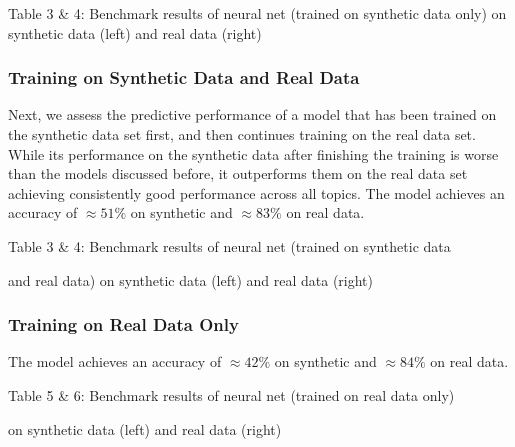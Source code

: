 \documentclass[11pt]{article}
\begin{document}
\begin{center}
	
\qquad

\end{center}
\begin{center}
Table 3 \& 4: Benchmark results of neural net (trained on synthetic data only) on synthetic data (left) and real data (right)
\end{center}




\subsubsection{Training on Synthetic Data and Real Data}
Next, we assess the predictive performance of a model that has been trained on the synthetic data set first, and then continues training on the real data set. While its performance on the synthetic data after finishing the training is worse than the models discussed before, it outperforms them on the real data set achieving consistently good performance across all topics. The model achieves an accuracy of $\approx 51\%$ on synthetic and $\approx 83\%$ on real data.
\begin{center}

\qquad

\end{center}
\begin{center}
Table 3 \& 4: Benchmark results of neural net (trained on synthetic data 

and real data) on synthetic data (left) and real data (right)
\end{center}


\subsubsection{Training on Real Data Only}
The model achieves an accuracy of $\approx 42\%$ on synthetic and $\approx 84\%$ on real data.
\begin{center}

\qquad

\end{center}
\begin{center}
Table 5 \& 6: Benchmark results of neural net (trained on real data only)

 on synthetic data (left) and real data (right)
\end{center}
\end{document}
